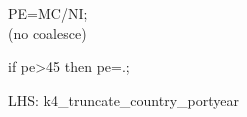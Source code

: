 

\usepackage[T1]{fontenc}




\thispagestyle{fancy}

\newcommand{\code}{\texttt}
\newcommand*{\Commonpath}{20190606}


PE=MC/NI;\\
(no coalesce)

if pe>45 then pe=.;

LHS: k4\_truncate\_country\_portyear





